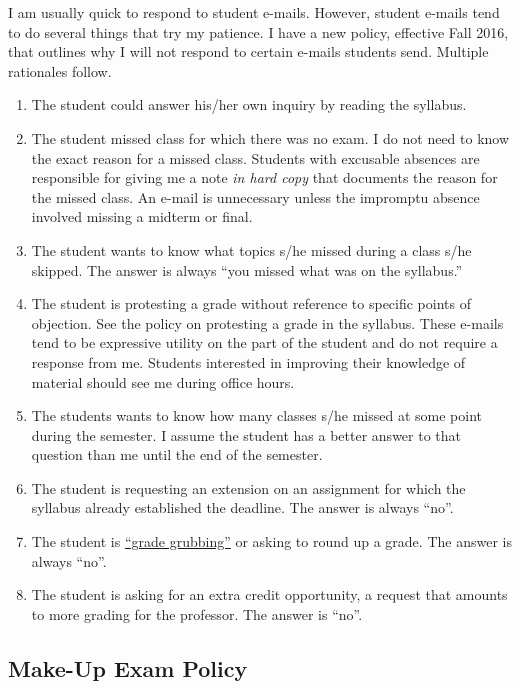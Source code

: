 \documentclass[11pt,]{article}
\providecommand{\tightlist}{%
  \setlength{\itemsep}{0pt}\setlength{\parskip}{0pt}}
\begin{document}
I am usually quick to respond to student e-mails. However, student
e-mails tend to do several things that try my patience. I have a new
policy, effective Fall 2016, that outlines why I will not respond to
certain e-mails students send. Multiple rationales follow.

\begin{enumerate}
\def\labelenumi{\arabic{enumi}.}
\tightlist
\item
  The student could answer his/her own inquiry by reading the syllabus.
\item
  The student missed class for which there was no exam. I do not need to
  know the exact reason for a missed class. Students with excusable
  absences are responsible for giving me a note \emph{in hard copy} that
  documents the reason for the missed class. An e-mail is unnecessary
  unless the impromptu absence involved missing a midterm or final.
\item
  The student wants to know what topics s/he missed during a class s/he
  skipped. The answer is always ``you missed what was on the syllabus.''
\item
  The student is protesting a grade without reference to specific points
  of objection. See the policy on protesting a grade in the syllabus.
  These e-mails tend to be expressive utility on the part of the student
  and do not require a response from me. Students interested in
  improving their knowledge of material should see me during office
  hours.
\item
  The students wants to know how many classes s/he missed at some point
  during the semester. I assume the student has a better answer to that
  question than me until the end of the semester.
\item
  The student is requesting an extension on an assignment for which the
  syllabus already established the deadline. The answer is always
  ``no''.
\item
  The student is
  \href{https://www.math.uh.edu/~tomforde/GradeGrubbing.html}{``grade
  grubbing''} or asking to round up a grade. The answer is always
  ``no''.
\item
  The student is asking for an extra credit opportunity, a request that
  amounts to more grading for the professor. The answer is ``no''.
\end{enumerate}

\hypertarget{make-up-exam-policy}{%
\subsection{Make-Up Exam Policy}\label{make-up-exam-policy}}
\end{document}
